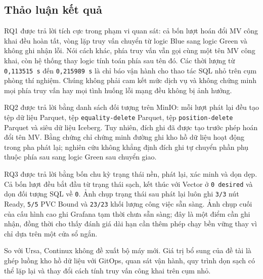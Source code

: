 \subsection{Thảo luận kết quả}
RQ1 được trả lời tích cực trong phạm vi quan sát: cả bốn lượt hoán đổi MV công khai đều hoàn tất, vòng lặp truy vấn chuyển từ logic Blue sang logic Green và không ghi nhận lỗi. Nói cách khác, phía truy vấn vẫn gọi cùng một tên MV công khai, còn hệ thống thay logic tính toán phía sau tên đó. Các thời lượng từ \texttt{0,113515 s} đến \texttt{0,215989 s} là chỉ báo vận hành cho thao tác SQL nhỏ trên cụm phòng thí nghiệm. Chúng không phải cam kết mức dịch vụ và không chứng minh mọi phía truy vấn hay mọi tình huống lỗi mạng đều không bị ảnh hưởng.

RQ2 được trả lời bằng danh sách đối tượng trên MinIO: mỗi lượt phát lại đều tạo tệp dữ liệu Parquet, tệp \texttt{equality-delete} Parquet, tệp \texttt{position-delete} Parquet và siêu dữ liệu Iceberg. Tuy nhiên, đích ghi đã được tạo trước phép hoán đổi tên MV. Bằng chứng chỉ chứng minh đường ghi kho hồ dữ liệu hoạt động trong pha phát lại; nghiên cứu không khẳng định đích ghi tự chuyển phần phụ thuộc phía sau sang logic Green sau chuyển giao.

RQ3 được trả lời bằng bốn chu kỳ trạng thái nền, phát lại, xác minh và dọn dẹp. Cả bốn lượt đều bắt đầu từ trạng thái sạch, kết thúc với Vector ở \texttt{0 desired} và dọn đối tượng SQL về \texttt{0}. Ảnh chụp trạng thái sau phát lại luôn ghi \texttt{3/3} nút Ready, \texttt{5/5} PVC Bound và \texttt{23/23} khối lượng công việc sẵn sàng. Ảnh chụp cuối của cấu hình cao ghi Grafana tạm thời chưa sẵn sàng; đây là một điểm cần ghi nhận, đồng thời cho thấy đánh giá dài hạn cần thêm phép chạy bền vững thay vì chỉ dựa trên một cửa sổ ngắn.

So với Ursa, Continux không đề xuất bộ máy mới. Giá trị bổ sung của đề tài là ghép luồng kho hồ dữ liệu với GitOps, quan sát vận hành, quy trình dọn sạch có thể lặp lại và thay đổi cách tính truy vấn công khai trên cụm nhỏ.

